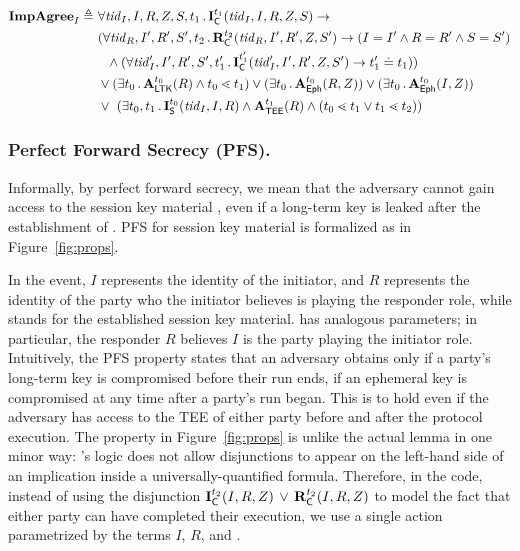 \begin{figure*}[ht]
\begin{align*}
%
    \mPredImpI \triangleq\ &
    \forall \mTID_I, I, R, \mSessKey, S, t_1\mLogicDot \mIComplete^{t_1}(\mTID_I, I, R, \mSessKey, 
S)
    \rightarrow\\
      &(\forall \mTID_R, I', R', S', t_2\mLogicDot \mRComplete^{t_2}(\mTID_R, I', R', \mSessKey, S') \rightarrow
             (I=I' \land R=R' \land S=S')\\
      &\ \ \land (\forall \mTID_I', I', R', S', t_1'\mLogicDot
        \mIComplete^{t_1'}(\mTID_I', I', R', \mSessKey, S') \rightarrow t_1' \doteq t_1
        ))\\
    &\lor(\exists t_0\mLogicDot \mRevLTK^{t_0}(R) \land t_0 \lessdot t_1)
    \lor(\exists t_0\mLogicDot \mRevEph^{t_0}(R, \mSessKey))
    \lor(\exists t_0\mLogicDot \mRevEph^{t_0}(I, \mSessKey))\\
    &\lor\ (\exists t_0, t_1\mLogicDot \mIStart^{t_0}(\mTID_I, I, R) \land \mTEE^{t_1}(R) \land (t_0 \lessdot t_1 \lor t_1 \lessdot t_2))
\end{align*}
%
\caption{Formalization of security properties and adversary model.}
\label{fig:props}
\end{figure*}


\subsubsection{Perfect Forward Secrecy (PFS).}
\label{sec:secrecy}
Informally, by perfect forward secrecy, we mean that the adversary cannot
gain access to the session key material \mSessKey{}, even if a long-term key is
leaked after the establishment of \mSessKey{}.
%
PFS for session key material \mSessKey{} is formalized as \mPredPcs{}
in Figure~\ref{fig:props}.
%

In the \mIComplete{} event, $I$ represents the identity of the initiator,
and $R$ represents the identity of the party who the initiator believes is
playing the responder role, while \mSessKey{} stands for the established
session key material.
%
\mRComplete{} has analogous parameters; in particular, the responder $R$
believes $I$ is the party playing the initiator role.
%
Intuitively, the PFS property states that an adversary obtains \mSessKey{}
only if a party's long-term key is compromised before their run ends, if an
ephemeral key is compromised at any time after a party's run began.
%
This is to hold even if the adversary has access to the TEE of either party
before and after the protocol execution.
%
The property in Figure~\ref{fig:props} is unlike the actual \mTamarin{} lemma
in one minor way: \mTamarin's logic does not allow disjunctions to appear on
the left-hand side of an implication inside a universally-quantified formula.
%
Therefore, in the \mTamarin{} code, instead of using the disjunction
$\mathbf{I}_{\textsf{C}}^{t_2}(I, R, Z)\, \lor\,  \mathbf{R}_{\textsf{C}}^{t_2}(I, R, 
Z)$
to model the fact that either party can have completed their execution, we use
a single action parametrized by the terms $I$, $R$, and \mSessKey.

